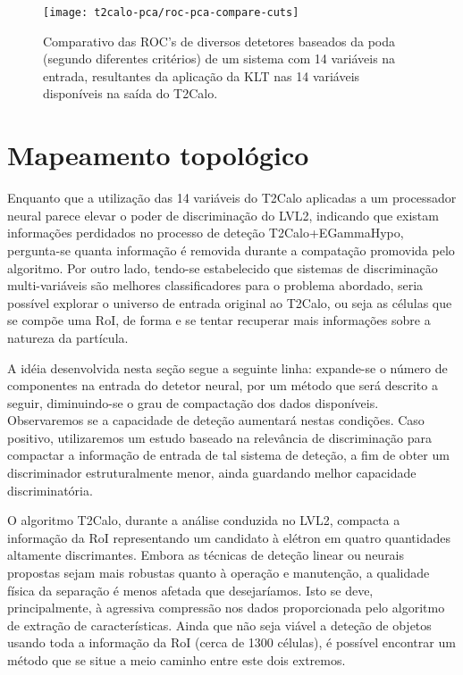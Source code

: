 \begin{figure}
\begin{center}
\texttt{[image: t2calo-pca/roc-pca-compare-cuts]}
\end{center}
\caption{Comparativo das ROC's de diversos detetores baseados da poda (segundo
diferentes critérios) de um sistema com 14 variáveis na entrada, resultantes
da aplicação da KLT nas 14 variáveis disponíveis na saída do T2Calo.}
\label{fig:roc-pca-compare-cuts}
\end{figure}

\section{Mapeamento topológico}

Enquanto que a utilização das 14 variáveis do T2Calo aplicadas a um
processador neural parece elevar o poder de discriminação do LVL2, indicando
que existam informações perdidados no processo de deteção T2Calo+EGammaHypo,
pergunta-se quanta informação é removida durante a compatação promovida pelo
algoritmo. Por outro lado, tendo-se estabelecido que sistemas de discriminação
multi-variáveis são melhores classificadores para o problema abordado, seria
possível explorar o universo de entrada original ao T2Calo, ou seja as células
que se compõe uma RoI, de forma e se tentar recuperar mais informações sobre a
natureza da partícula.

A idéia desenvolvida nesta seção segue a seguinte linha: expande-se o número
de componentes na entrada do detetor neural, por um método que será descrito a
seguir, diminuindo-se o grau de compactação dos dados
disponíveis. Observaremos se a capacidade de deteção aumentará nestas
condições. Caso positivo, utilizaremos um estudo baseado na relevância de 
discriminação para compactar a informação de entrada de tal sistema de
deteção, a fim de obter um discriminador estruturalmente menor, ainda
guardando melhor capacidade discriminatória.

O algoritmo T2Calo, durante a análise conduzida no LVL2, compacta a informação
da RoI representando um candidato à elétron em quatro quantidades altamente
discrimantes. Embora as técnicas de deteção linear ou neurais propostas sejam
mais robustas quanto à operação e manutenção, a qualidade física da separação
é menos afetada que desejaríamos. Isto se deve, principalmente, à agressiva
compressão nos dados proporcionada pelo algoritmo de extração de
características. Ainda que não seja viável a deteção de objetos usando toda a
informação da RoI (cerca de 1300 células), é possível encontrar um método que
se situe a meio caminho entre este dois extremos.

